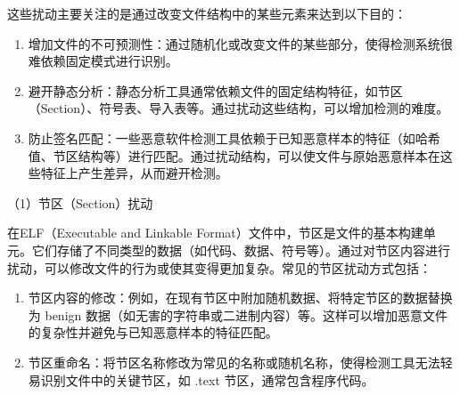 这些扰动主要关注的是通过改变文件结构中的某些元素来达到以下目的：
\begin{enumerate}
	 
\item 增加文件的不可预测性：通过随机化或改变文件的某些部分，使得检测系统很难依赖固定模式进行识别。

\item 避开静态分析：静态分析工具通常依赖文件的固定结构特征，如节区（Section）、符号表、导入表等。通过扰动这些结构，可以增加检测的难度。

\item 防止签名匹配：一些恶意软件检测工具依赖于已知恶意样本的特征（如哈希值、节区结构等）进行匹配。通过扰动结构，可以使文件与原始恶意样本在这些特征上产生差异，从而避开检测。
\end{enumerate}

（1）节区（Section）扰动


在ELF（Executable and Linkable Format）文件中，节区是文件的基本构建单元。它们存储了不同类型的数据（如代码、数据、符号等）。通过对节区内容进行扰动，可以修改文件的行为或使其变得更加复杂。常见的节区扰动方式包括：

\begin{enumerate}


\item 节区内容的修改：例如，在现有节区中附加随机数据、将特定节区的数据替换为 benign 数据（如无害的字符串或二进制内容）等。这样可以增加恶意文件的复杂性并避免与已知恶意样本的特征匹配。


\item 节区重命名：将节区名称修改为常见的名称或随机名称，使得检测工具无法轻易识别文件中的关键节区，如 .text 节区，通常包含程序代码。
\end{enumerate}

